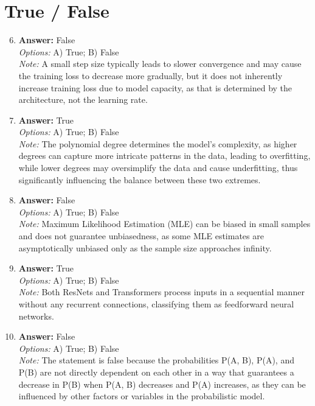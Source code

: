 \documentclass[12pt]{article}
\begin{document}
\section*{True / False}
\begin{enumerate}[label=\arabic*.]
\setcounter{enumi}{5}
\item \textbf{Answer:} False
\\ \textit{Options:} A) True; B) False
\\ \textit{Note:} A small step size typically leads to slower convergence and may cause the training loss to decrease more gradually, but it does not inherently increase training loss due to model capacity, as that is determined by the architecture, not the learning rate.
\item \textbf{Answer:} True
\\ \textit{Options:} A) True; B) False
\\ \textit{Note:} The polynomial degree determines the model's complexity, as higher degrees can capture more intricate patterns in the data, leading to overfitting, while lower degrees may oversimplify the data and cause underfitting, thus significantly influencing the balance between these two extremes.
\item \textbf{Answer:} False
\\ \textit{Options:} A) True; B) False
\\ \textit{Note:} Maximum Likelihood Estimation (MLE) can be biased in small samples and does not guarantee unbiasedness, as some MLE estimates are asymptotically unbiased only as the sample size approaches infinity.
\item \textbf{Answer:} True
\\ \textit{Options:} A) True; B) False
\\ \textit{Note:} Both ResNets and Transformers process inputs in a sequential manner without any recurrent connections, classifying them as feedforward neural networks.
\item \textbf{Answer:} False
\\ \textit{Options:} A) True; B) False
\\ \textit{Note:} The statement is false because the probabilities P(A, B), P(A), and P(B) are not directly dependent on each other in a way that guarantees a decrease in P(B) when P(A, B) decreases and P(A) increases, as they can be influenced by other factors or variables in the probabilistic model.
\end{enumerate}
\end{document}
